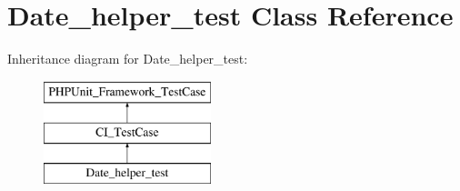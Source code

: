 \hypertarget{class_date__helper__test}{}\section{Date\+\_\+helper\+\_\+test Class Reference}
\label{class_date__helper__test}
Inheritance diagram for Date\+\_\+helper\+\_\+test\+:\begin{figure}[H]
\begin{center}
\leavevmode
\includegraphics[height=3.000000cm]{class_date__helper__test}
\end{center}
\end{figure}
